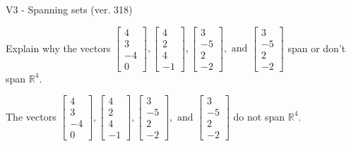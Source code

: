 \begin{exercise}
  \begin{exerciseTitle}V3 - Spanning sets (ver. 318)\end{exerciseTitle}
  \begin{exerciseStatement}
    Explain why the vectors \(\left[\begin{array}{r}
4 \\
3 \\
-4 \\
0
\end{array}\right] , \left[\begin{array}{r}
4 \\
2 \\
4 \\
-1
\end{array}\right] , \left[\begin{array}{r}
3 \\
-5 \\
2 \\
-2
\end{array}\right] , \text{ and } \left[\begin{array}{r}
3 \\
-5 \\
2 \\
-2
\end{array}\right]\) span or don't span \(\mathbb{R}^4\). 
	


  \end{exerciseStatement}
  \begin{exerciseAnswer}
   The vectors \(\left[\begin{array}{r}
4 \\
3 \\
-4 \\
0
\end{array}\right] , \left[\begin{array}{r}
4 \\
2 \\
4 \\
-1
\end{array}\right] , \left[\begin{array}{r}
3 \\
-5 \\
2 \\
-2
\end{array}\right] , \text{ and } \left[\begin{array}{r}
3 \\
-5 \\
2 \\
-2
\end{array}\right]\) 
  	 do not  
	span \(\mathbb{R}^4\).
  


  \end{exerciseAnswer}
\end{exercise}